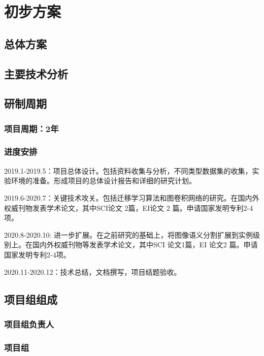 



\section{初步方案}

\subsection{总体方案}



\subsection{主要技术分析}

\subsection{研制周期}
\subsubsection{项目周期：2年}

\subsubsection{进度安排}

2019.1-2019.5：项目总体设计。包括资料收集与分析，不同类型数据集的收集，实验环境的准备。形成项目的总体设计报告和详细的研究计划。

2019.6-2020.7：关键技术攻关。包括迁移学习算法和图卷积网络的研究。在国内外权威刊物发表学术论文，其中SCI论文 2篇，EI论文 2 篇。申请国家发明专利2-4项。

2020.8-2020.10: 进一步扩展。在之前研究的基础上，将图像语义分割扩展到实例级别上。在国内外权威刊物等发表学术论文，其中SCI 论文1篇，EI 论文2 篇。申请国家发明专利2-4项。

2020.11-2020.12：技术总结，文档撰写，项目结题验收。


\subsection{项目组组成}
\subsubsection{项目组负责人}

\subsubsection{项目组}



